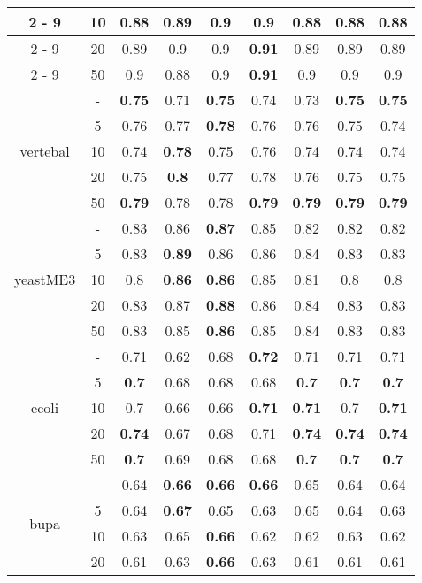 \documentclass{article}%
\begin{document}
\begin{longtable}{c|c|ccccccc}
\cline{2%
-%
9}%
&10&0.88&0.89&\textbf{0.9}&\textbf{0.9}&0.88&0.88&0.88\\%
\cline{2%
-%
9}%
&20&0.89&0.9&0.9&\textbf{0.91}&0.89&0.89&0.89\\%
\cline{2%
-%
9}%
&50&0.9&0.88&0.9&\textbf{0.91}&0.9&0.9&0.9\\%
\hline%
\multirow{5}{*}{vertebal}&{-}&\textbf{0.75}&0.71&\textbf{0.75}&0.74&0.73&\textbf{0.75}&\textbf{0.75}\\%
\cline{2%
-%
9}%
&5&0.76&0.77&\textbf{0.78}&0.76&0.76&0.75&0.74\\%
\cline{2%
-%
9}%
&10&0.74&\textbf{0.78}&0.75&0.76&0.74&0.74&0.74\\%
\cline{2%
-%
9}%
&20&0.75&\textbf{0.8}&0.77&0.78&0.76&0.75&0.75\\%
\cline{2%
-%
9}%
&50&\textbf{0.79}&0.78&0.78&\textbf{0.79}&\textbf{0.79}&\textbf{0.79}&\textbf{0.79}\\%
\hline%
\multirow{5}{*}{yeastME3}&{-}&0.83&0.86&\textbf{0.87}&0.85&0.82&0.82&0.82\\%
\cline{2%
-%
9}%
&5&0.83&\textbf{0.89}&0.86&0.86&0.84&0.83&0.83\\%
\cline{2%
-%
9}%
&10&0.8&\textbf{0.86}&\textbf{0.86}&0.85&0.81&0.8&0.8\\%
\cline{2%
-%
9}%
&20&0.83&0.87&\textbf{0.88}&0.86&0.84&0.83&0.83\\%
\cline{2%
-%
9}%
&50&0.83&0.85&\textbf{0.86}&0.85&0.84&0.83&0.83\\%
\hline%
\multirow{5}{*}{ecoli}&{-}&0.71&0.62&0.68&\textbf{0.72}&0.71&0.71&0.71\\%
\cline{2%
-%
9}%
&5&\textbf{0.7}&0.68&0.68&0.68&\textbf{0.7}&\textbf{0.7}&\textbf{0.7}\\%
\cline{2%
-%
9}%
&10&0.7&0.66&0.66&\textbf{0.71}&\textbf{0.71}&0.7&\textbf{0.71}\\%
\cline{2%
-%
9}%
&20&\textbf{0.74}&0.67&0.68&0.71&\textbf{0.74}&\textbf{0.74}&\textbf{0.74}\\%
\cline{2%
-%
9}%
&50&\textbf{0.7}&0.69&0.68&0.68&\textbf{0.7}&\textbf{0.7}&\textbf{0.7}\\%
\hline%
\multirow{5}{*}{bupa}&{-}&0.64&\textbf{0.66}&\textbf{0.66}&\textbf{0.66}&0.65&0.64&0.64\\%
\cline{2%
-%
9}%
&5&0.64&\textbf{0.67}&0.65&0.63&0.65&0.64&0.63\\%
\cline{2%
-%
9}%
&10&0.63&0.65&\textbf{0.66}&0.62&0.62&0.63&0.62\\%
\cline{2%
-%
9}%
&20&0.61&0.63&\textbf{0.66}&0.63&0.61&0.61&0.61\\%

\end{longtable}
\end{document}
